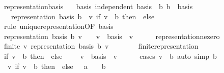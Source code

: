 \begin{isabellebody}
\ representation{\isacharunderscore}{\kern0pt}basis{\isacharcolon}{\kern0pt}\isanewline
\ \ \ basis{\isacharcolon}{\kern0pt}\ {\isachardoublequoteopen}independent\ basis{\isachardoublequoteclose}\ \ b{\isacharcolon}{\kern0pt}\ {\isachardoublequoteopen}b\ {\isasymin}\ basis{\isachardoublequoteclose}\isanewline
\ \ \ {\isachardoublequoteopen}representation\ basis\ b\ {\isacharequal}{\kern0pt}\ {\isacharparenleft}{\kern0pt}{\isasymlambda}v{\isachardot}{\kern0pt}\ if\ v\ {\isacharequal}{\kern0pt}\ b\ then\ {}\ else\ {}{\isacharparenright}{\kern0pt}{\isachardoublequoteclose}\isanewline
%
\isadelimproof
%
\endisadelimproof
%
\isatagproof
{}\isamarkupfalse%
\ {\isacharparenleft}{\kern0pt}rule\ unique{\isacharunderscore}{\kern0pt}representation{\isacharbrackleft}{\kern0pt}OF\ basis{\isacharbrackright}{\kern0pt}{\isacharparenright}{\kern0pt}\isanewline
\ \ \isamarkupfalse%
\ {\isachardoublequoteopen}representation\ basis\ b\ v\ {\isasymnoteq}\ {}\ {\isasymLongrightarrow}\ v\ {\isasymin}\ basis{\isachardoublequoteclose}\ \ v\isanewline
\ \ \ \ \isamarkupfalse%
\ representation{\isacharunderscore}{\kern0pt}ne{\isacharunderscore}{\kern0pt}zero\ \isacommand{{\isachardot}{\kern0pt}}\isamarkupfalse%
\isanewline
\ \ \isamarkupfalse%
\ {\isachardoublequoteopen}finite\ {\isacharbraceleft}{\kern0pt}v{\isachardot}{\kern0pt}\ representation\ basis\ b\ v\ {\isasymnoteq}\ {}{\isacharbraceright}{\kern0pt}{\isachardoublequoteclose}\isanewline
\ \ \ \ \isamarkupfalse%
\ finite{\isacharunderscore}{\kern0pt}representation\ \isacommand{{\isachardot}{\kern0pt}}\isamarkupfalse%
\isanewline
\ \ \isamarkupfalse%
\ {\isachardoublequoteopen}{\isacharparenleft}{\kern0pt}if\ v\ {\isacharequal}{\kern0pt}\ b\ then\ {}\ else\ {}{\isacharparenright}{\kern0pt}\ {\isasymnoteq}\ {}\ {\isasymLongrightarrow}\ v\ {\isasymin}\ basis{\isachardoublequoteclose}\ \ v\isanewline
\ \ \ \ \isamarkupfalse%
\ {\isacharparenleft}{\kern0pt}cases\ {\isachardoublequoteopen}v\ {\isacharequal}{\kern0pt}\ b{\isachardoublequoteclose}{\isacharparenright}{\kern0pt}\ {\isacharparenleft}{\kern0pt}auto\ simp{\isacharcolon}{\kern0pt}\ b{\isacharparenright}{\kern0pt}\isanewline
\ \ \isamarkupfalse%
\ {\isacharasterisk}{\kern0pt}{\isacharcolon}{\kern0pt}\ {\isachardoublequoteopen}{\isacharbraceleft}{\kern0pt}v{\isachardot}{\kern0pt}\ {\isacharparenleft}{\kern0pt}if\ v\ {\isacharequal}{\kern0pt}\ b\ then\ {}\ else\ {}\ {\isacharcolon}{\kern0pt}{\isacharcolon}{\kern0pt}\ {\isacharprime}{\kern0pt}a{\isacharparenright}{\kern0pt}\ {\isasymnoteq}\ {}{\isacharbraceright}{\kern0pt}\ {\isacharequal}{\kern0pt}\ {\isacharbraceleft}{\kern0pt}b{\isacharbraceright}{\kern0pt}{\isachardoublequoteclose}\isanewline

\end{isabellebody}
